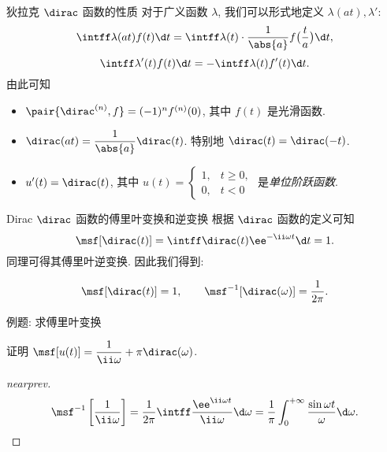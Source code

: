 \begin{frame}{狄拉克 $\dirac$ 函数的性质}
	\onslide<+->
	对于广义函数 $\lambda$, 我们可以形式地定义 $\lambda(at),\lambda'$:
	\[
		\intff \lambda(at)f(t)\d t
	=\intff \lambda(t)\cdot\frac1{\abs{a}}f\bigl(\frac ta\bigr)\d t,
	\]
	\[
		\intff \lambda'(t)f(t)\d t
	=-\intff \lambda(t)f'(t)\d t.
	\]
	\onslide<+->
	由此可知
	\begin{itemize}
		\item $\pair{\dirac^{(n)},f}=(-1)^nf^{(n)}(0)$, 其中 $f(t)$ 是光滑函数.
		\item $\dirac(at)=\dfrac1{\abs{a}}\dirac(t)$. 特别地 $\dirac(t)=\dirac(-t)$.
		\item $u'(t)=\dirac(t)$, 其中 $u(t)=\begin{cases}1,&t\ge0,\\0,&t<0\end{cases}$ 是\emph{单位阶跃函数}.
	\end{itemize}
\end{frame}


\begin{frame}{Dirac $\dirac$ 函数的傅里叶变换和逆变换}
	\onslide<+->
	根据 $\dirac$ 函数的定义可知
	\[
		\msf[\dirac(t)]=\intff \dirac(t)\ee^{-\ii \omega t}\d t=1.
	\]
	\onslide<+->
	同理可得其傅里叶逆变换.
	\onslide<+->
	因此我们得到:
	\begin{theorem*}[][]%
	\[
		\msf[\dirac(t)]=1,\qquad
		\msf^{-1}[\dirac(\omega)]=\dfrac1{2\pi}.
	\]
	\end{theorem*}
\end{frame}


\begin{frame}{例题: 求傅里叶变换}
	\onslide<+->
	\begin{example}[nearnext]
		证明 \alert{$\msf[u(t)]=\dfrac1{\ii \omega}+\pi\dirac(\omega)$}.
	\end{example}
	\onslide<+->
	\begin{proof}[nearprev]
		\[
			\msf^{-1}\left[\frac1{\ii \omega}\right]
				=\frac1{2\pi}\intff \frac{\ee^{\ii \omega t}}{\ii \omega} \d\omega
				=\frac1\pi\int_0^{+\infty}\frac{\sin\omega t}{\omega} \d\omega.
		\]
		\onslide<+->{%
			故
			\[
				\msf^{-1} \left[\frac1{\ii \omega}+\pi\dirac(\omega)\right]
				=\half\sgn(t)+\half =u(t)\quad (t\neq 0).\qedhere
			\]
		}
	\end{proof}
\end{frame}


